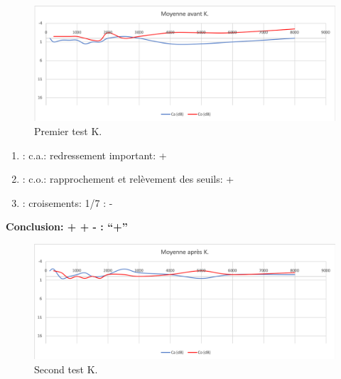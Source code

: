         \begin{figure}
\centering
\includegraphics[width=0.7\linewidth]{images/graphiques/kad_pre.png}
\caption[Moyenne OG+OD]{Premier test K.}
       
\label{groupecontroleimage1}
\end{figure}
	\begin{enumerate}
 		
 		\item : c.a.: redressement important: +
                
 		\item : c.o.: rapprochement et relèvement des seuils: +
 		\item : croisements: 1/7 :  -
                  
                \end{enumerate}

                \textbf{  Conclusion:  + + -       : ``+''}

                 \begin{figure}
\centering
\includegraphics[width=0.7\linewidth]{images/graphiques/kad_post.png}
\caption[Moyenne OG+OD]{Second test K.}
       
\label{groupecontroleimage1}
\end{figure}

